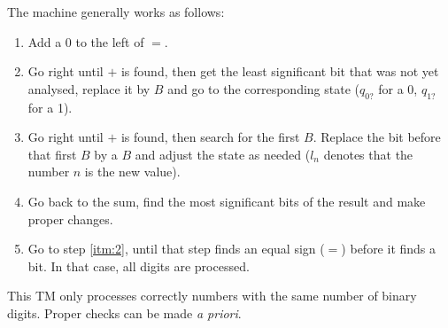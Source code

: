 {\begin{center}
\end{center}
The machine generally works as follows:
\begin{enumerate}
	\item Add a $0$ to the left of $=$.
	\item \label{itm:2} Go right until $+$ is found, then get the least significant bit that was not yet analysed, replace it by $B$ and go to the corresponding state ($q_{0?}$ for a 0, $q_{1?}$ for a 1).
	\item Go right until $+$ is found, then search for the first $B$. Replace the bit before that first $B$ by a $B$ and adjust the state as needed ($l_n$ denotes that the number $n$ is the new value).
	\item Go back to the sum, find the most significant bits of the result and make proper changes.
	\item Go to step \ref{itm:2}, until that step finds an equal sign ($=$) before it finds a bit. In that case, all digits are processed.
\end{enumerate}
This TM only processes correctly numbers with the same number of binary digits. Proper checks can be made \textit{a priori}.
}
